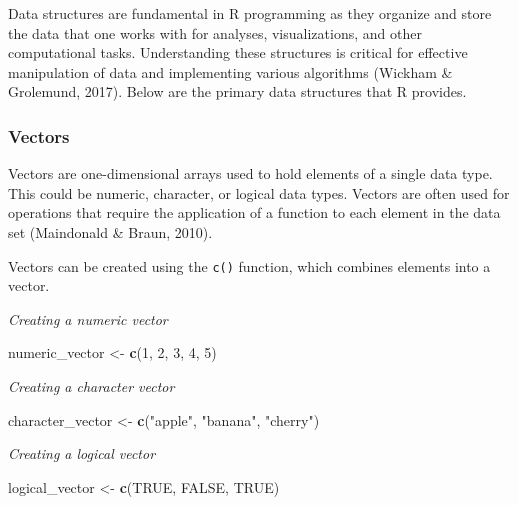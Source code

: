 \documentclass[
]{book}
\newenvironment{Shaded}{\begin{snugshade}}{\end{snugshade}}
\newcommand{\ConstantTok}[1]{\textcolor[rgb]{0.56,0.35,0.01}{#1}}
\newcommand{\DecValTok}[1]{\textcolor[rgb]{0.00,0.00,0.81}{#1}}
\newcommand{\FunctionTok}[1]{\textcolor[rgb]{0.13,0.29,0.53}{\textbf{#1}}}
\newcommand{\NormalTok}[1]{#1}
\newcommand{\OtherTok}[1]{\textcolor[rgb]{0.56,0.35,0.01}{#1}}
\newcommand{\StringTok}[1]{\textcolor[rgb]{0.31,0.60,0.02}{#1}}
\begin{document}
Data structures are fundamental in R programming as they organize and store the data that one works with for analyses, visualizations, and other computational tasks. Understanding these structures is critical for effective manipulation of data and implementing various algorithms (Wickham \& Grolemund, 2017). Below are the primary data structures that R provides.

\subsubsection*{Vectors}\label{vectors}

Vectors are one-dimensional arrays used to hold elements of a single data type. This could be numeric, character, or logical data types. Vectors are often used for operations that require the application of a function to each element in the data set (Maindonald \& Braun, 2010).

Vectors can be created using the \texttt{c()} function, which combines elements into a vector.

\emph{Creating a numeric vector}

\begin{Shaded}
\begin{Highlighting}[]
\NormalTok{numeric\_vector }\OtherTok{\textless{}{-}} \FunctionTok{c}\NormalTok{(}\DecValTok{1}\NormalTok{, }\DecValTok{2}\NormalTok{, }\DecValTok{3}\NormalTok{, }\DecValTok{4}\NormalTok{, }\DecValTok{5}\NormalTok{)}
\end{Highlighting}
\end{Shaded}

\emph{Creating a character vector}

\begin{Shaded}
\begin{Highlighting}[]
\NormalTok{character\_vector }\OtherTok{\textless{}{-}} \FunctionTok{c}\NormalTok{(}\StringTok{"apple"}\NormalTok{, }\StringTok{"banana"}\NormalTok{, }\StringTok{"cherry"}\NormalTok{)}
\end{Highlighting}
\end{Shaded}

\emph{Creating a logical vector}

\begin{Shaded}
\begin{Highlighting}[]
\NormalTok{logical\_vector }\OtherTok{\textless{}{-}} \FunctionTok{c}\NormalTok{(}\ConstantTok{TRUE}\NormalTok{, }\ConstantTok{FALSE}\NormalTok{, }\ConstantTok{TRUE}\NormalTok{)}
\end{Highlighting}
\end{Shaded}
\end{document}

